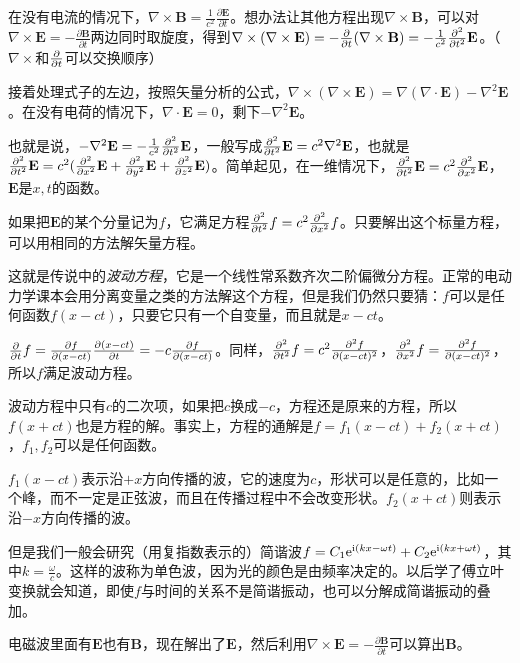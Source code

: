 在没有电流的情况下，$\nabla \times \mathbf{B}=\frac{1}{c^2} \frac{\partial \mathbf{E}}{\partial t}$。想办法让其他方程出现$\nabla \times \mathbf{B}$，可以对$\nabla \times \mathbf{E}=-\frac{\partial \mathbf{B}}{\partial t}$两边同时取旋度，得到$\nabla \times (\nabla \times \mathbf{E})=-\frac{\partial}{\partial t}(\nabla \times \mathbf{B})=-\frac{1}{c^2} \frac{\partial^{2}}{\partial t^{2}} \mathbf{E}$。（$\nabla \times$和$\frac{\partial}{\partial t}$可以交换顺序）

接着处理式子的左边，按照矢量分析的公式，$\nabla \times (\nabla \times \mathbf{E})=\nabla(\nabla \cdot \mathbf{E})-\nabla^2 \mathbf{E}$。在没有电荷的情况下，$\nabla \cdot \mathbf{E}=0$，剩下$-\nabla^2 \mathbf{E}$。

也就是说，$-\nabla^2 \mathbf{E}=-\frac{1}{c^2} \frac{\partial^{2}}{\partial t^{2}} \mathbf{E}$，一般写成$\frac{\partial^{2}}{\partial t^{2}} \mathbf{E}=c^2 \nabla^2 \mathbf{E}$，也就是$\frac{\partial^{2}}{\partial t^{2}} \mathbf{E}=c^2 (\frac{\partial^{2}}{\partial x^{2}} \mathbf{E}+\frac{\partial^{2}}{\partial y^{2}} \mathbf{E}+\frac{\partial^{2}}{\partial z^{2}} \mathbf{E})$。简单起见，在一维情况下，$\frac{\partial^{2}}{\partial t^{2}} \mathbf{E}=c^2 \frac{\partial^{2}}{\partial x^{2}} \mathbf{E}$，$\mathbf{E}$是$x,t$的函数。

如果把$\mathbf{E}$的某个分量记为$f$，它满足方程$\frac{\partial^{2}}{\partial t^{2}} f=c^2 \frac{\partial^{2}}{\partial x^{2}} f$。只要解出这个标量方程，可以用相同的方法解矢量方程。

这就是传说中的\emph{波动方程}，它是一个线性常系数齐次二阶偏微分方程。正常的电动力学课本会用分离变量之类的方法解这个方程，但是我们仍然只要猜：$f$可以是任何函数$f(x-c t)$，只要它只有一个自变量，而且就是$x-c t$。

$\frac{\partial}{\partial t} f=\frac{\partial f}{\partial(x-c t)}\frac{\partial(x-c t)}{\partial t}=-c \frac{\partial f}{\partial(x-c t)}$。同样，$\frac{\partial^{2}}{\partial t^{2}} f=c^2 \frac{\partial^2 f}{\partial(x-c t)^2}$，$\frac{\partial^{2}}{\partial x^{2}} f=\frac{\partial^2 f}{\partial(x-c t)^2}$，所以$f$满足波动方程。

波动方程中只有$c$的二次项，如果把$c$换成$-c$，方程还是原来的方程，所以$f(x+c t)$也是方程的解。事实上，方程的通解是$f=f_1(x-c t)+f_2(x+c t)$，$f_1,f_2$可以是任何函数。

$f_1(x-c t)$表示沿$+x$方向传播的波，它的速度为$c$，形状可以是任意的，比如一个峰，而不一定是正弦波，而且在传播过程中不会改变形状。$f_2(x+c t)$则表示沿$-x$方向传播的波。

但是我们一般会研究（用复指数表示的）简谐波$f=C_1 \mathrm{e}^{\mathrm{i} (k x-\omega t)}+C_2 \mathrm{e}^{\mathrm{i} (k x+\omega t)}$，其中$k=\frac{\omega}{c}$。这样的波称为单色波，因为光的颜色是由频率决定的。以后学了傅立叶变换就会知道，即使$f$与时间的关系不是简谐振动，也可以分解成简谐振动的叠加。

电磁波里面有$\mathbf{E}$也有$\mathbf{B}$，现在解出了$\mathbf{E}$，然后利用$\nabla \times \mathbf{E}=-\frac{\partial \mathbf{B}}{\partial t}$可以算出$\mathbf{B}$。
